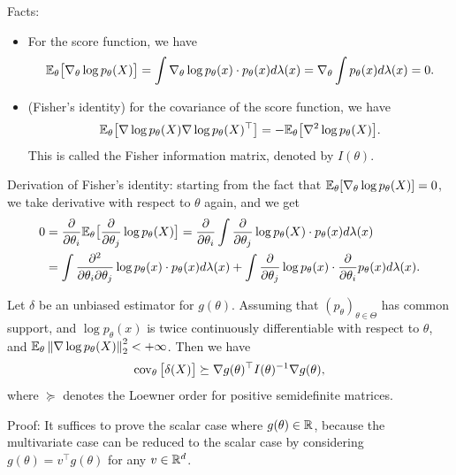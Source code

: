 \documentclass[11pt,letterpaper]{article}
\numberwithin{theorem}{lecture}
\numberwithin{proposition}{lecture}
\numberwithin{lemma}{lecture}
\numberwithin{claim}{lecture}
\numberwithin{corollary}{lecture}
\numberwithin{definition}{lecture}
\numberwithin{conjecture}{lecture}
\numberwithin{remark}{lecture}
\numberwithin{example}{lecture}
\numberwithin{equation}{lecture}
\begin{document}
Facts:
\begin{itemize}
  \item For the score function, we have
  \begin{align*}
    {\mathbb{E}}_\theta \big[ \nabla_\theta \log p_\theta (X) \big] = \int \nabla_\theta \log p_\theta (x) \cdot p_\theta (x) d\lambda(x) = \nabla_\theta \int p_\theta (x) d\lambda(x) = 0.
  \end{align*}
  \item (Fisher's identity) for the covariance of the score function, we have
  \begin{align*}
    {\mathbb{E}}_\theta \big[ \nabla \log p_\theta (X) \nabla \log p_\theta (X)^\top \big] = -{\mathbb{E}}_\theta \big[ \nabla^2 \log p_\theta (X) \big].
  \end{align*}
  This is called the Fisher information matrix, denoted by $I(\theta)$.
\end{itemize}
Derivation of Fisher's identity: starting from the fact that ${\mathbb{E}}_\theta [\nabla_\theta \log p_\theta (X)] = 0$, we take derivative with respect to $\theta$ again, and we get
\begin{align*}
 0 &= \frac{\partial}{\partial \theta_i} {\mathbb{E}}_\theta \big[ \frac{\partial}{\partial \theta_j}\log p_\theta (X) \big]
 =\frac{\partial}{\partial \theta_i} \int \frac{\partial}{\partial \theta_j}\log p_\theta (X)  \cdot p_\theta (x) d\lambda(x)\\
 &= \int \frac{\partial^2}{\partial \theta_i \partial \theta_j} \log p_\theta (x) \cdot p_\theta (x) d\lambda(x) + \int \frac{\partial}{\partial \theta_j} \log p_\theta (x) \cdot \frac{\partial}{\partial \theta_i} p_\theta (x) d\lambda(x).
\end{align*}
\begin{theorem}
  Let $\delta$ be an unbiased estimator for $g (\theta)$. Assuming that $(p_\theta)_{\theta \in \Theta}$ has common support, and $\log p_\theta (x)$ is twice continuously differentiable with respect to $\theta$, and ${\mathbb{E}}_\theta \left\| \nabla \log p_\theta (X)\right\|_{2}^2 < + \infty$. Then we have
  \begin{align*}
    \operatorname{cov}_\theta \big[ \delta (X) \big] \succeq \nabla g (\theta)^\top I(\theta)^{-1} \nabla g (\theta),
  \end{align*}
  where $\succeq$ denotes the Loewner order for positive semidefinite matrices.
\end{theorem}
Proof: It suffices to prove the scalar case where $g (\theta) \in \mathbb{R}$, because the multivariate case can be reduced to the scalar case by considering $g (\theta) = v^\top g (\theta)$ for any $v \in \mathbb{R}^d$.
\end{document}
